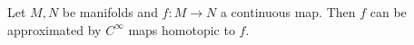 Let $M, N$ be manifolds and $f: M \to N$ a continuous map. Then $f$ can be approximated by $C^\infty$ maps homotopic to $f$.
